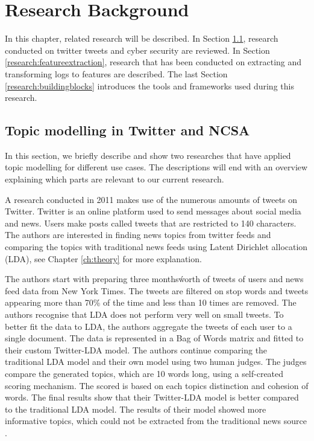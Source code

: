 \chapter{Research Background}  \label{ch:research}

In this chapter, related research will be described. In Section \ref{research:relatedwork}, research conducted on twitter tweets and cyber security are reviewed. In Section \ref{research:featureextraction}, research that has been conducted on extracting and transforming logs to features are described. The last Section \ref{research:buildingblocks} introduces the tools and frameworks used during this research.

\section{Topic modelling in Twitter and NCSA} \label{research:relatedwork}
In this section, we briefly describe and show two researches that have applied topic modelling for different use cases. The descriptions will end with an overview explaining which parts are relevant to our current research. 

\setlength{\parindent}{3ex} A research conducted in 2011 makes use of the numerous amounts of tweets on Twitter. Twitter is an online platform used to send messages about social media and news. Users make posts called tweets that are restricted to 140 characters. The authors are interested in finding news topics from twitter feeds and comparing the topics with traditional news feeds using Latent Dirichlet allocation (LDA), see Chapter \ref{ch:theory} for more explanation.

The authors start with preparing three months\' worth of tweets of users and news feed data from New York Times. The tweets are filtered on stop words and tweets appearing more than 70\% of the time and less than 10 times are removed. The authors recognise that LDA does not perform very well on small tweets. To better fit the data to LDA, the authors aggregate the tweets of each user to a single document. The data is represented in a Bag of Words matrix and fitted to their custom Twitter-LDA model. The authors continue comparing the traditional LDA model and their own model using two human judges. The judges compare the generated topics, which are 10 words long, using a self-created scoring mechanism. The scored is based on each topics distinction and cohesion of words. The final results show that their Twitter-LDA model is better compared to the traditional LDA model. The results of their model showed more informative topics, which could not be extracted from the traditional news source \cite{Zhao2011ComparingModels}. 

